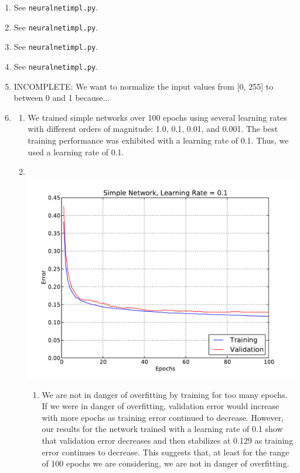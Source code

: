 \documentclass[solution, letterpaper]{cs121}
\begin{document}
\begin{enumerate}
	\item See {\tt neural\textunderscore net\textunderscore impl.py}.
	\item See {\tt neural\textunderscore net\textunderscore impl.py}.
	\item See {\tt neural\textunderscore net\textunderscore impl.py}.
	\item See {\tt neural\textunderscore net\textunderscore impl.py}.
	\item INCOMPLETE: We want to normalize the input values from [0, 255] to between 0 and 1 because... 
	\item
		\begin{enumerate}
		\item We trained simple networks over 100 epochs using several learning rates with different orders of magnitude: 1.0, 0.1, 0.01, and 0.001. The best training performance was exhibited with a learning rate of 0.1. Thus, we used a learning rate of 0.1.
		\item \hfill \\
		\includegraphics[scale=0.8]{Simple-Network-Alpha-0_1.pdf}
			\begin{enumerate}
				\item We are not in danger of overfitting by training for too many epochs. If we were in danger of overfitting, validation error would increase with more epochs as training error continued to decrease. However, our results for the network trained with a learning rate of 0.1 show that validation error decreases and then stabilizes at 0.129 as training error continues to decrease. This suggests that, at least for the range of 100 epochs we are considering, we are not in danger of overfitting. 

\end{enumerate}
\end{enumerate}
\end{enumerate}
\end{document}
